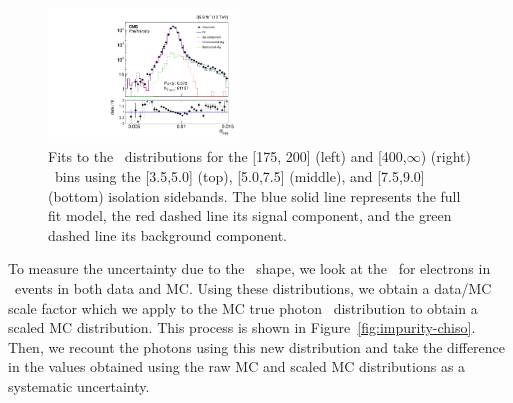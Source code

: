 \begin{figure}[htbp]
  \includegraphics[width=0.45\textwidth]{Calibration/Figures/pvsf/ssfit_400_medium_far_logy.pdf}
  \caption{
    Fits to the \sieie\ distributions for the [175, 200] (left) and [400,$\infty$) (right) \pt\ bins using the [3.5,5.0] (top), [5.0,7.5] (middle), and [7.5,9.0] (bottom) isolation sidebands.
      The blue solid line represents the full fit model, the red dashed line its signal component, and the green dashed line its background component.
    }
  \label{fig:impurity-sideband}
\end{figure}

To measure the uncertainty due to the \ICH\ shape, we look at the \ICH\ for electrons in \Zee\ events in both data and MC. 
Using these distributions, we obtain a data/MC scale factor which we apply to the MC true photon \ICH\ distribution to obtain a scaled MC distribution. 
This process is shown in Figure~\ref{fig:impurity-chiso}. 
Then, we recount the photons using this new distribution and take the difference in the values obtained using the raw MC and scaled MC distributions as a systematic uncertainty.

